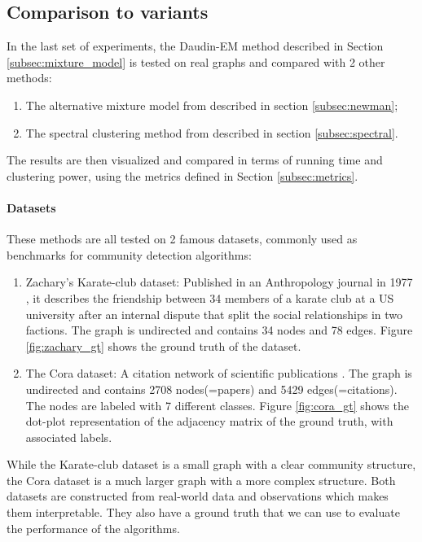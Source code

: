 \documentclass[switch, 12pt]{article}
\begin{document}
\begin{multicols}{2}
    \subsection{Comparison to variants}

    In the last set of experiments, the Daudin-EM method \cite{main_article} described in Section \ref{subsec:mixture_model} is tested on real graphs and compared with 2 other methods:
    \begin{enumerate}
        \item The alternative mixture model from \cite{newman} described in section \ref{subsec:newman};
        \item The spectral clustering method from \cite{spectral} described in section \ref{subsec:spectral}.
    \end{enumerate}

    The results are then visualized and compared in terms of running time and clustering power, using the metrics defined in Section \ref{subsec:metrics}.
    \paragraph{Datasets}
    These methods are all tested on 2 famous datasets, commonly used as benchmarks for community detection algorithms:
    \begin{enumerate}
        \item Zachary's Karate-club dataset: Published in an Anthropology journal in 1977 \cite{karate}, it describes the friendship between 34 members of a karate club at a US university after an internal dispute that split the social relationships in two factions. The graph is undirected and contains 34 nodes and 78 edges. Figure \ref{fig:zachary_gt} shows the ground truth of the dataset.
        \item The Cora dataset: A citation network of scientific publications \cite{cora}. The graph is undirected and contains 2708 nodes(=papers) and 5429 edges(=citations). The nodes are labeled with 7 different classes. Figure \ref{fig:cora_gt} shows the dot-plot representation of the adjacency matrix of the ground truth, with associated labels.
    \end{enumerate}
    While the Karate-club dataset is a small graph with a clear community structure, the Cora dataset is a much larger graph with a more complex structure. Both datasets are constructed from real-world data and observations which makes them interpretable. They also have a ground truth that we can use to evaluate the performance of the algorithms.


\end{multicols}
\end{document}
